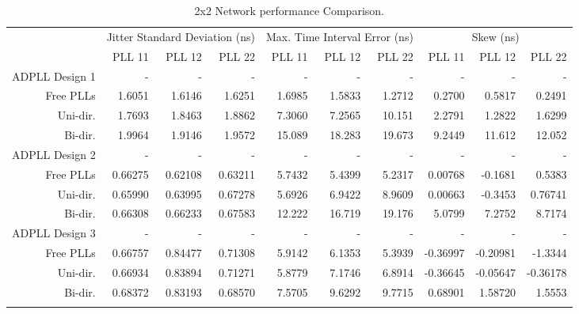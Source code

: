 \begin{table}[!ht]
    \begin{center}
        \begin{footnotesize}
            \setlength{\tabcolsep}{.9\tabcolsep}
            \begin{tabular}{ll|r|r|r|r|r|r|r|r|r|}           
                \cline{3-11}
                && \multicolumn{3}{c|}{Jitter Standard Deviation (ns)} & \multicolumn{3}{c|}{Max. Time Interval Error (ns)} & \multicolumn{3}{c|}{Skew (ns)} \T\\
                \cline{3-11} 
                &&PLL 11&PLL 12&PLL 22    &PLL 11&PLL 12&PLL 22    &PLL 11&PLL 12&PLL 22\T\\
                \hline
                \multicolumn{2}{|l|}{\ac{ADPLL} Design 1}&-&-&-&-&-&-&-&-&-\T\\
                \multicolumn{2}{|r|}{Free PLLs} &1.6051  &1.6146  &1.6251     &1.6985 &1.5833 &1.2712    &0.2700 &0.5817 &0.2491 \T\\
                \multicolumn{2}{|r|}{Uni-dir.}  &1.7693  &1.8463  &1.8862     &7.3060 &7.2565 &10.151    &2.2791 &1.2822 &1.6299 \T\\
                \multicolumn{2}{|r|}{Bi-dir.}   &1.9964  &1.9146  &1.9572     &15.089 &18.283 &19.673    &9.2449 &11.612 &12.052 \T\\
                \hline
                \multicolumn{2}{|l|}{\ac{ADPLL} Design 2}&-&-&-&-&-&-&-&-&-\T\\
                \multicolumn{2}{|r|}{Free PLLs} &0.66275 &0.62108 &0.63211    &5.7432 &5.4399 &5.2317    &0.00768 &-0.1681 &0.5383  \T\\
                \multicolumn{2}{|r|}{Uni-dir.}  &0.65990 &0.63995 &0.67278    &5.6926 &6.9422 &8.9609    &0.00663 &-0.3453 &0.76741 \T\\
                \multicolumn{2}{|r|}{Bi-dir.}   &0.66308 &0.66233 &0.67583    &12.222 &16.719 &19.176    &5.0799  & 7.2752 &8.7174  \T\\
                \hline
                \multicolumn{2}{|l|}{\ac{ADPLL} Design 3}&-&-&-&-&-&-&-&-&-\T\\
                \multicolumn{2}{|r|}{Free PLLs} &0.66757 &0.84477 &0.71308    &5.9142 &6.1353 &5.3939    &-0.36997 &-0.20981 &-1.3344  \T\\
                \multicolumn{2}{|r|}{Uni-dir.}  &0.66934 &0.83894 &0.71271    &5.8779 &7.1746 &6.8914    &-0.36645 &-0.05647 &-0.36178 \T\\
                \multicolumn{2}{|r|}{Bi-dir.}   &0.68372 &0.83193 &0.68570    &7.5705 &9.6292 &9.7715    & 0.68901 & 1.58720 & 1.5553  \T\\
                \hline
                \B                
            \end{tabular}
        \end{footnotesize}
        \caption{2x2 Network performance Comparison.}
        \label{table:2x2perf}
    \end{center}
    \vspace{-0.5cm}
\end{table}
